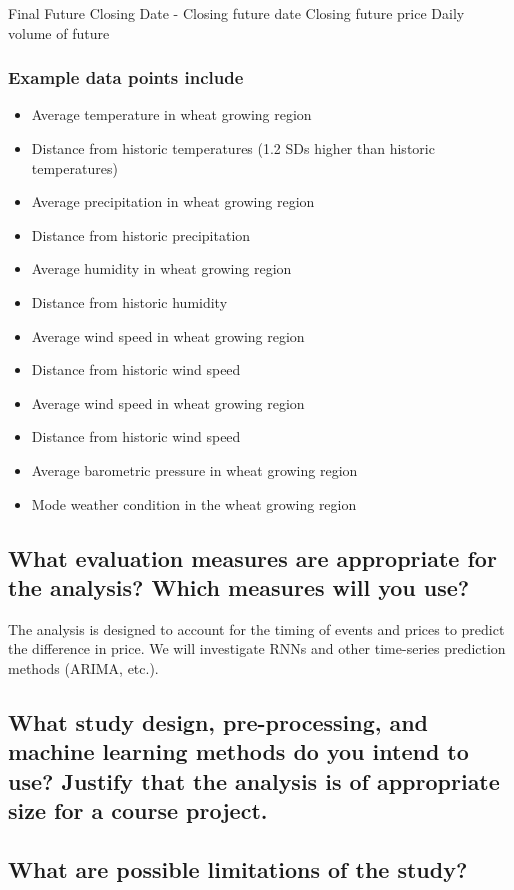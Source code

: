 \documentclass[twoside,11pt]{article}
\begin{document}
Final Future Closing Date - Closing future date
Closing future price
Daily volume of future

\subsubsection{Example data points include}
\begin{itemize}
  \item Average temperature in wheat growing region 
  \item Distance from historic temperatures (1.2 SDs higher than historic temperatures)
  \\
  \item Average precipitation in wheat growing region
  \item Distance from historic precipitation
  \\
  \item Average humidity in wheat growing region
  \item Distance from historic humidity
  \\
  \item Average wind speed in wheat growing region
  \item Distance from historic wind speed
  \\
  \item Average wind speed in wheat growing region
  \item Distance from historic wind speed
  \\
  \item Average barometric pressure in wheat growing region
  \item Mode weather condition in the wheat growing region
\end{itemize}


\subsection{What evaluation measures are appropriate for the analysis? Which measures will you use?}

The analysis is designed to account for the timing of events and prices to predict the difference in price. We will investigate RNNs and other time-series prediction methods (ARIMA, etc.). 

\subsection{What study design, pre-processing, and machine learning methods do you intend to use? Justify that the analysis is of appropriate size for a course project.}



\subsection{What are possible limitations of the study?}



\end{document}
